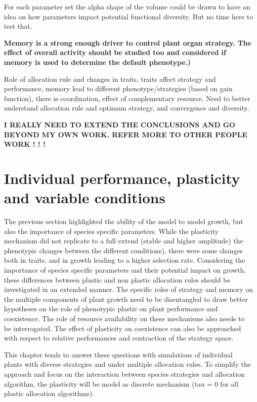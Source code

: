 For each parameter set the alpha shape of the volume could be drawn to have an idea on how parameters impact potential functional diversity. But no time here to test that.


\textbf{Memory is a strong enough driver to control plant organ strategy. The effect of overall activity should be studied too and considered if memory is used to determine the default phenotype.)}

Role of allocation rule and changes in traits, traits affect strategy and performance, memory lead to different phenotype/strategies (based on gain function), there is coordination, effect of complementary resource. Need to better understand allocation rule and optimum strategy, and convergence and diversity. 

\textbf{I REALLY NEED TO EXTEND THE CONCLUSIONS AND GO BEYOND MY OWN WORK. REFER MORE TO OTHER PEOPLE WORK ! ! !}

\chapter{Individual performance, plasticity and variable conditions}\label{chapter:individual}

The previous section highlighted the ability of the model to model growth, but also the importance of species specific parameters. While the plasticity mechanism did not replicate to a full extend (stable and higher amplitude) the phenotypic changes between the  different conditions), there were some changes both in traits, and in growth leading to a higher selection rate. Considering the importance of species specific parameters and their potential impact on growth, these differences between plastic and non plastic allocation rules should be investigated in an extended manner. The specific roles of strategy and memory on the multiple components of plant growth need to be disentangled to draw better hypotheses on the role of phenotypic plastic on plant performance and coexistence. The role of resource availability on these mechanisms also needs to be interrogated. The effect of plasticity on coexistence can also be approached with respect to relative performances and contraction of the strategy space.

This chapter tends to answer these questions with simulations of individual plants with diverse strategies and under multiple allocation rules. To simplify the approach and focus on the interaction between species strategies and allocation algorithm, the plasticity will be model as discrete mechanism (tau = 0 for all plastic allocation algorithms).

